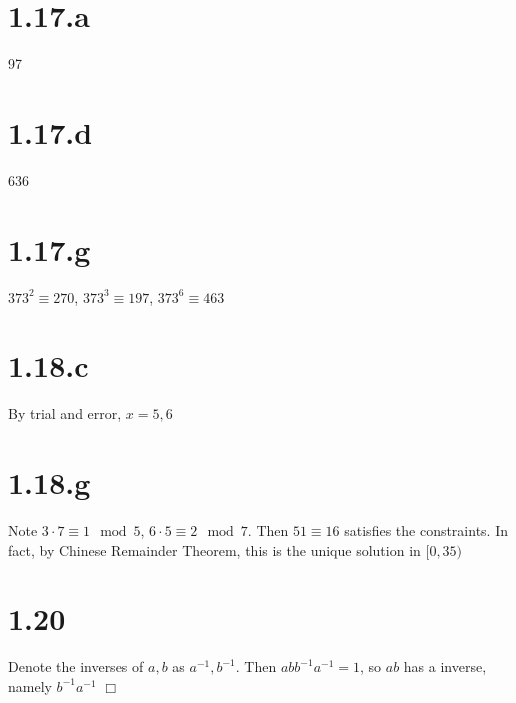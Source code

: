 \documentclass{article}
\begin{document}
\section*{1.17.a}
97
\section*{1.17.d}
636
\section*{1.17.g}
$373^2 \equiv 270$, $373^3 \equiv 197$, $373^6 \equiv 463$

\section*{1.18.c}
By trial and error, $x = 5,6$
\section*{1.18.g}
Note $3\cdot 7 \equiv 1 \mod 5$, $6\cdot 5 \equiv 2 \mod 7$. Then $51 \equiv 16$ satisfies the constraints. In fact, by Chinese Remainder Theorem, this is the unique solution in $[0,35)$

\section*{1.20}
Denote the inverses of $a,b$ as $a^{-1}, b^{-1}$. Then $abb^{-1}a^{-1} = 1$, so $ab$ has a inverse, namely $b^{-1}a^{-1}$ $\Box$
\end{document}
